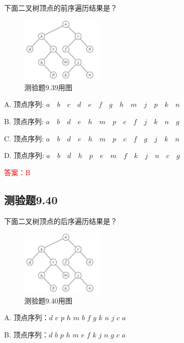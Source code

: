 \documentclass[UTF8, heading=true]{ctexart}
\begin{document}
下面二叉树顶点的前序遍历结果是？

\begin{figure}[H]
  \centering
  \includegraphics[width=0.35\textwidth]{9.37.jpg} %
  \caption{测验题9.39用图}
\end{figure}

A. 顶点序列: $a \quad b \quad c \quad d \quad e \quad f \quad g \quad h \quad m \quad j \quad p \quad k \quad n$

B. 顶点序列: $a \quad b \quad d \quad e \quad h \quad m \quad p \quad c \quad f \quad j \quad k \quad n \quad g$

C. 顶点序列: $a \quad b \quad d \quad e \quad h \quad m \quad p \quad c \quad f \quad g \quad j \quad k \quad n$

D. 顶点序列: $a \quad b \quad d \quad h \quad p \quad e \quad m \quad f \quad k \quad j \quad n \quad c \quad g$

\textcolor{red}{答案：B}

\subsection{测验题9.40}

下面二叉树顶点的后序遍历结果是？

\begin{figure}[H]
  \centering
  \includegraphics[width=0.35\textwidth]{9.37.jpg} %
  \caption{测验题9.40用图}
\end{figure}

A. 顶点序列：$d$ \quad $e$ \quad $p$ \quad $h$ \quad $m$ \quad $b$ \quad $f$ \quad $g$ \quad $k$ \quad $n$ \quad $j$ \quad $c$ \quad $a$

B. 顶点序列：$d$ \quad $b$ \quad $p$ \quad $h$ \quad $m$ \quad $e$ \quad $f$ \quad $k$ \quad $j$ \quad $n$ \quad $g$ \quad $c$ \quad $a$
\end{document}
